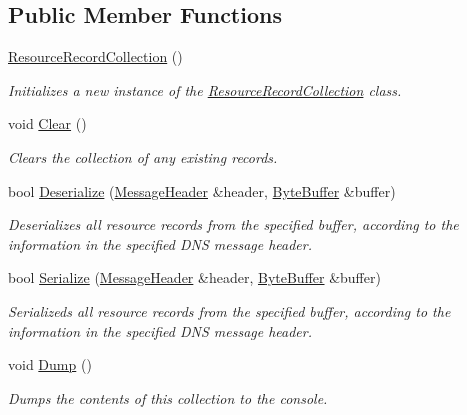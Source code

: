\subsection*{Public Member Functions}
\begin{DoxyCompactItemize}
\item 
\hyperlink{class_senergy_1_1_dns_1_1_resource_record_collection_a66f740bd63a874374e471973ee236d78}{Resource\-Record\-Collection} ()
\begin{DoxyCompactList}\small\item\em Initializes a new instance of the \hyperlink{class_senergy_1_1_dns_1_1_resource_record_collection}{Resource\-Record\-Collection} class. \end{DoxyCompactList}\item 
void \hyperlink{class_senergy_1_1_dns_1_1_resource_record_collection_ad0d89b82d1a6d862d84e411decf81527}{Clear} ()
\begin{DoxyCompactList}\small\item\em Clears the collection of any existing records. \end{DoxyCompactList}\item 
bool \hyperlink{class_senergy_1_1_dns_1_1_resource_record_collection_ae228f7ec1cf020033f64f68a3f5ea4e1}{Deserialize} (\hyperlink{class_senergy_1_1_dns_1_1_message_header}{Message\-Header} \&header, \hyperlink{class_senergy_1_1_byte_buffer}{Byte\-Buffer} \&buffer)
\begin{DoxyCompactList}\small\item\em Deserializes all resource records from the specified buffer, according to the information in the specified D\-N\-S message header. \end{DoxyCompactList}\item 
bool \hyperlink{class_senergy_1_1_dns_1_1_resource_record_collection_affa4da32b82b69f712c2383ab4f9ee8c}{Serialize} (\hyperlink{class_senergy_1_1_dns_1_1_message_header}{Message\-Header} \&header, \hyperlink{class_senergy_1_1_byte_buffer}{Byte\-Buffer} \&buffer)
\begin{DoxyCompactList}\small\item\em Serializeds all resource records from the specified buffer, according to the information in the specified D\-N\-S message header. \end{DoxyCompactList}\item 
void \hyperlink{class_senergy_1_1_dns_1_1_resource_record_collection_a62ac608c82f209ec4b0c2ed5bc155a73}{Dump} ()
\begin{DoxyCompactList}\small\item\em Dumps the contents of this collection to the console. \end{DoxyCompactList}\item 

\end{DoxyCompactItemize}
